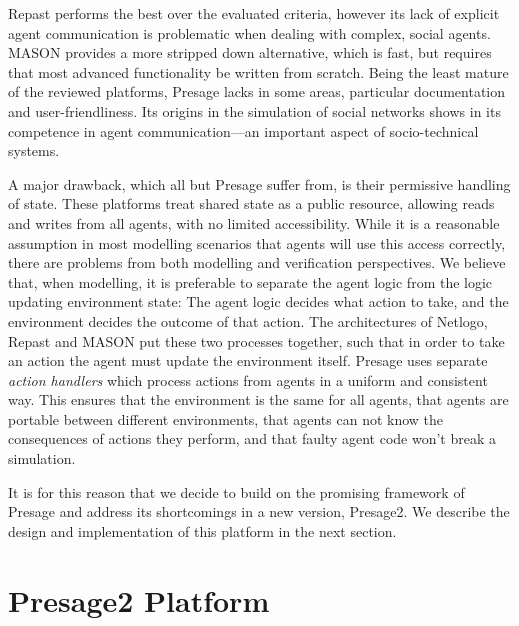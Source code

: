 Repast performs the best over the evaluated criteria, however its lack of
explicit agent communication is problematic when dealing with complex, social
agents. MASON provides a more stripped down alternative, which is fast, but
requires that most advanced functionality be written from scratch. Being the
least mature of the reviewed platforms, Presage lacks in some areas,
particular documentation and user-friendliness. Its origins in the simulation
of social networks shows in its competence in agent communication---an
important aspect of socio-technical systems.

A major drawback, which all but Presage suffer from, is their permissive handling of state. These platforms treat shared state as a public resource, allowing reads and writes from all agents, with no limited accessibility. While it is a reasonable assumption in most modelling scenarios that agents will use this access correctly, there are problems from both modelling and verification perspectives. We believe that, when modelling, it is preferable to separate the agent logic from the logic updating environment state: The agent logic decides what action to take, and the environment decides the outcome of that action. The architectures of Netlogo, Repast and MASON put these two processes together, such that in order to take an action the agent must update the environment itself. Presage uses separate \emph{action handlers} which process actions from agents in a uniform and consistent way. This ensures that the environment is the same for all agents, that agents are portable between different environments, that agents can not know the consequences of actions they perform, and that faulty agent code won't break a simulation.

It is for this reason that we decide to build on the promising  framework of Presage and address its shortcomings in a new version, Presage2. We describe the design and implementation of this platform in the next section.




\section{Presage2 Platform}


